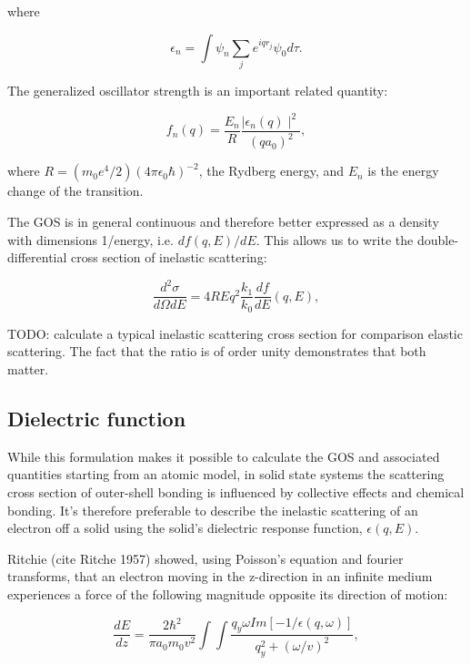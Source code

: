 \documentclass [11pt, proquest, article] {uwthesis}[2016/11/22]
\begin{document}
where

\begin{equation}
	\epsilon_n = \int \psi_n \sum_j e^{i q r_j} \psi_0 d\tau.
\end{equation}


The generalized oscillator strength is an important related quantity:

\begin{equation}
f_n(q) = \frac{E_n}{R} \frac{\mid \epsilon_n(q)\mid ^2}{(q a_0)^2},
\end{equation}


where $R = (m_0 e^4 / 2)(4 \pi \epsilon_0 \hbar)^{-2}$, the Rydberg energy, and $E_n$ is the energy change of the transition. 

The GOS is in general continuous and therefore better expressed as a density with dimensions 1/energy, i.e. $df(q, E)/dE$. This allows us to write the double-differential cross section of inelastic scattering:

\begin{equation} \label{inelastic_DDCS}
\frac{d^2\sigma}{d\Omega dE} = {4 R}{Eq^2} \frac{k_1}{k_0} \frac{df}{dE}(q, E),
\end{equation}

TODO: calculate a typical inelastic scattering cross section for comparison elastic scattering. The fact that the ratio is of order unity demonstrates that both matter.

\subsection{Dielectric function}
While this formulation makes it possible to calculate the GOS and associated quantities starting from an atomic model, in solid state systems the scattering cross section of outer-shell bonding is influenced by collective effects and chemical bonding. It's therefore preferable to describe the inelastic scattering of an electron off a solid using the solid's dielectric response function, $\epsilon(q, E)$. 

Ritchie (cite Ritche 1957) showed, using Poisson's equation and fourier transforms, that an electron moving in the z-direction in an infinite medium experiences a force of the following magnitude opposite its direction of motion: 


\begin{equation} \label{stp}
\frac{dE}{dz} = \frac{2\hbar^2}{\pi a_0 m_0 v^2} \int \int \frac{q_y \omega Im[-1/\epsilon(q, \omega)]}{q_y^2 + (\omega/v)^2},
\end{equation}
\end{document}
